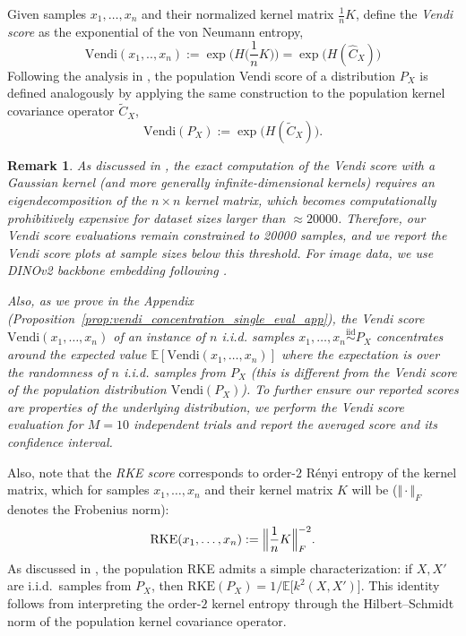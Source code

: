\documentclass{article}
\newtheorem{remark}{Remark}
\theoremstyle{plain}
\theoremstyle{definition}
\begin{document}
Given samples $x_1,\ldots,x_n$ and their normalized kernel matrix $\frac{1}{n}K$, \citet{friedman2023vendi} define the \textit{Vendi score} as the exponential of the von Neumann entropy,
\begin{equation}\label{eq:vendi_score}
    \mathrm{Vendi}(x_1,..,x_n)\! :=\! \exp\bigl(H\bigl(\frac{1}{n}K\bigr)\bigr) =\exp\bigl(H(\widehat{C}_X)\bigr)
\end{equation}
Following the analysis in \citep{bach2022itkernel,ospanov2025vendi}, the population Vendi score of a distribution $P_X$ is defined analogously by applying the same construction to the population kernel covariance operator $\widetilde{C}_X$,
\begin{equation}
    \mathrm{Vendi}(P_X) := \exp\bigl(H(\widetilde{C}_X)\bigr).
\end{equation}
\begin{remark}
As discussed in \citep{friedman2023vendi,ospanov_fkea_2024}, the \emph{exact} computation of the Vendi score with a Gaussian kernel (and more generally infinite-dimensional kernels) requires an eigendecomposition of the $n\times n$ kernel matrix, which becomes computationally prohibitively expensive for dataset sizes larger than $\approx 20000$. Therefore, our Vendi score evaluations remain constrained to 20000 samples,  and we report the Vendi score plots at sample sizes below this threshold. For image data, we use DINOv2 backbone embedding following \citep{stein_exposing_2023}. 

Also, as we prove in the Appendix (Proposition~\ref{prop:vendi_concentration_single_eval_app}), the Vendi score $\mathrm{Vendi}(x_1,\ldots ,x_n)$ of an instance of $n$ i.i.d. samples $x_1,\ldots ,x_n\stackrel{\text{iid}}{\sim} P_X$ concentrates around the expected value $\mathbb{E}[\mathrm{Vendi}(x_1,\ldots ,x_n)]$ where the expectation is over the randomness of $n$ i.i.d. samples from $P_X$ (this is different from the Vendi score of the population distribution $\mathrm{Vendi}(P_X)$). To further ensure our reported scores are properties of the underlying distribution, we perform the Vendi score evaluation for $M=10$ independent trials and report the averaged score and its confidence interval.  
\end{remark}
Also, note that the \textit{RKE score} \citep{jalali2023rke} corresponds to order-$2$ Rényi entropy of the kernel matrix, which for  samples $x_1,\ldots,x_n$ and their kernel matrix $K$  will be ($\Vert\cdot \Vert_F$ denotes the Frobenius norm):
\begin{equation}\label{eq:rke_score}
    \mathrm{RKE}(x_1,\ldots,x_n) := \Bigl\Vert\frac{1}{n}K\Bigr\Vert_F^{-2}.
\end{equation}
As discussed in \citep{jalali2023rke}, the population RKE admits a simple characterization: if $X,X'$ are i.i.d.\ samples from $P_X$, then
$\mathrm{RKE}(P_X) = {1}/{\mathbb{E}\bigl[k^2(X,X')\bigr]}$. This identity follows from interpreting the order-$2$ kernel entropy through the Hilbert--Schmidt norm of the population kernel covariance operator.
\end{document}
